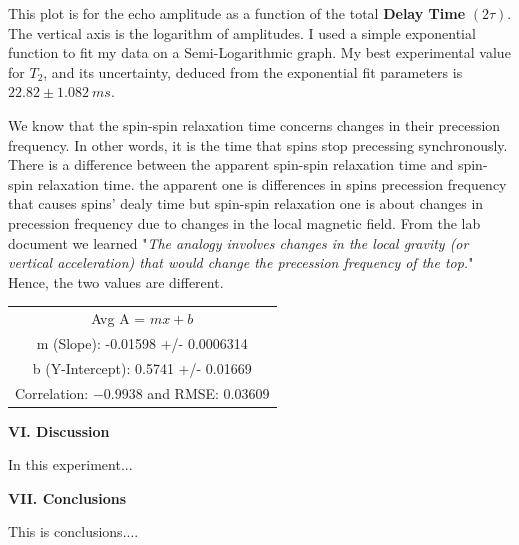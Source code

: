 \documentclass[fleqn]{article}
\begin{document}
  \vspace{10px}

  This plot is for the echo amplitude as a function of the total \textbf{Delay Time} $(2 \tau)$. The vertical axis is 
  the logarithm of amplitudes. I used a simple exponential function to fit my data on a Semi-Logarithmic graph. My best experimental value for $T_2$, and its uncertainty, deduced from the
  exponential fit parameters is $22.82 \pm 1.082 ~ ms$. 
  
  We know that the spin-spin relaxation time concerns changes in their precession frequency. In other words, it is the time that spins stop precessing
  synchronously. There is a difference between the apparent spin-spin relaxation time and  spin-spin relaxation time. the apparent one is 
  differences in spins precession frequency that causes spins' dealy time but spin-spin relaxation one is about changes in precession frequency 
  due to changes in the local magnetic field. From the lab document we learned "\emph{The analogy involves changes in
  the local gravity (or vertical acceleration) that would change the precession frequency of the top.}" Hence, the two values are different.

  \begin{center}
    \begin{tabular}{ |c| } 
     \hline
     Avg A = $mx+b$  \\ 
     m (Slope): -0.01598 +/- 0.0006314  \\ 
     b (Y-Intercept): 0.5741 +/- 0.01669  \\ 
     Correlation: $-0.9938$ and RMSE: 0.03609 \\
     \hline
    \end{tabular}
  \end{center}

  \pagebreak


  \textbf{VI. Discussion}

  \vspace{10px}

  In this experiment...
  
  \vspace{20px}


  \textbf{VII. Conclusions}

  \vspace{10px}

  This is conclusions....
  
  \vspace{20px}


  \printbibliography
\end{document}
